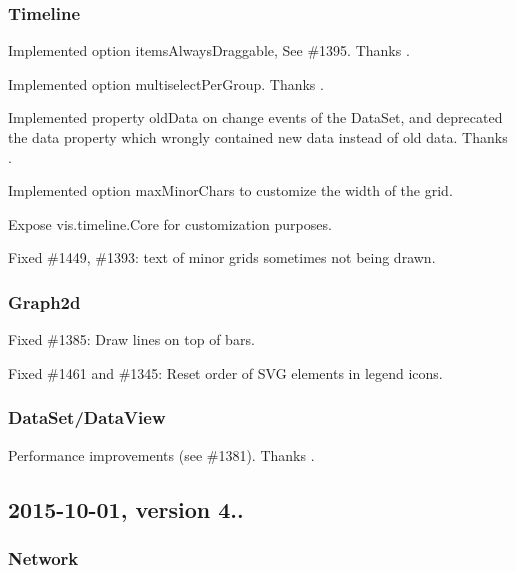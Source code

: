 \subsubsection*{Timeline}


\begin{DoxyItemize}
\item Implemented option {\ttfamily items\+Always\+Draggable}, See \#1395. Thanks .
\item Implemented option {\ttfamily multiselect\+Per\+Group}. Thanks .
\item Implemented property {\ttfamily old\+Data} on change events of the Data\+Set, and deprecated the {\ttfamily data} property which wrongly contained new data instead of old data. Thanks .
\item Implemented option {\ttfamily max\+Minor\+Chars} to customize the width of the grid.
\item Expose {\ttfamily vis.\+timeline.\+Core} for customization purposes.
\item Fixed \#1449, \#1393\+: text of minor grids sometimes not being drawn.
\end{DoxyItemize}

\subsubsection*{Graph2d}


\begin{DoxyItemize}
\item Fixed \#1385\+: Draw lines on top of bars.
\item Fixed \#1461 and \#1345\+: Reset order of S\+VG elements in legend icons.
\end{DoxyItemize}

\subsubsection*{Data\+Set/\+Data\+View}


\begin{DoxyItemize}
\item Performance improvements (see \#1381). Thanks .
\end{DoxyItemize}

\subsection*{2015-\/10-\/01, version 4..}

\subsubsection*{Network}


